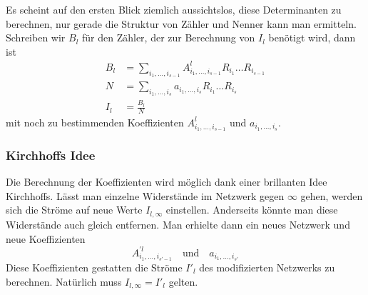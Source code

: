 Es scheint auf den ersten Blick ziemlich aussichtslos, diese
Determinanten zu berechnen, nur gerade die Struktur von Zähler
und Nenner kann man ermitteln. Schreiben wir $B_l$ für den 
Zähler, der zur Berechnung von $I_l$ benötigt wird, dann ist
\begin{align*}
B_l&=\sum_{i_1,\dots,i_{s-1}}A^l_{i_1,\dots,i_{s-1}}R_{i_1}\dots R_{i_{s-1}}\\
N&=\sum_{i_1,\dots,i_s}a_{i_1,\dots,i_s}R_{i_1}\dots R_{i_s}\\
I_l&=\frac{B_l}{N}
\end{align*}
mit noch zu bestimmenden Koeffizienten $A_{i_1,\dots,i_{s-1}}^l$
und $a_{i_1,\dots,i_s}$.

\subsubsection{Kirchhoffs Idee}
Die Berechnung der Koeffizienten wird möglich dank einer brillanten
Idee Kirchhoffs. Lässt man einzelne Widerstände im Netzwerk gegen
$\infty$ gehen, werden sich die Ströme auf neue Werte $I_{l,\infty}$
einstellen. Anderseits könnte man diese Widerstände auch gleich entfernen.
Man erhielte dann ein neues Netzwerk und neue Koeffizienten
\[
A_{i_1,\dots,i_{s'-1}}^{\prime l}
\quad
\text{und}
\quad
a_{i_1,\dots,i_{s'}}
\]
Diese Koeffizienten gestatten die Ströme $I'_l$ des modifizierten Netzwerks
zu berechnen. Natürlich muss $I_{l,\infty}=I'_l$ gelten.


